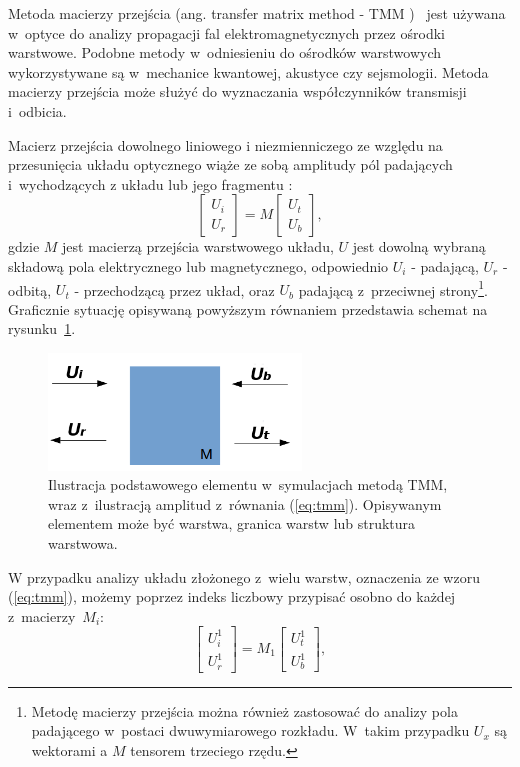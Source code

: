 \label{subart:tmm}
Metoda macierzy przejścia  (ang. transfer matrix method - TMM )~\cite{teich1991fundamentalsTMM} jest używana w~optyce do analizy propagacji fal elektromagnetycznych przez ośrodki warstwowe. Podobne metody w~odniesieniu do ośrodków warstwowych wykorzystywane są w~mechanice kwantowej, akustyce czy sejsmologii. Metoda macierzy przejścia może służyć do wyznaczania współczynników transmisji i~odbicia.

Macierz przejścia dowolnego liniowego i niezmienniczego ze względu na przesunięcia układu optycznego wiąże ze sobą amplitudy pól padających i~wychodzących z układu lub jego fragmentu \cite{markos2008wave,teich1991fundamentalsTMM}:
\begin{equation}
\begin{bmatrix}
U_i \\ 
U_r
\end{bmatrix}
= M 
\begin{bmatrix}
U_t \\
U_b
\end{bmatrix},
\label{eq:tmm}
\end{equation}
gdzie $M$ jest macierzą przejścia warstwowego układu, $U$ jest dowolną wybraną składową pola elektrycznego lub magnetycznego, odpowiednio $U_i$ - padającą, $U_r$ - odbitą, $U_t$ - przechodzącą przez układ, oraz $U_b$ padającą  z~przeciwnej strony\footnote{Metodę macierzy przejścia można również zastosować do analizy pola padającego w~postaci dwuwymiarowego rozkładu. W~takim przypadku $U_x$ są wektorami a $M$ tensorem trzeciego rzędu.}. Graficznie sytuację opisywaną powyższym równaniem przedstawia schemat na rysunku~\ref{fig:tmm-simple}.

\begin{figure}
	\includegraphics[width=0.6\textwidth]{images/tmm.png}
	\caption{Ilustracja podstawowego elementu w~symulacjach metodą TMM, wraz z~ilustracją amplitud z~równania (\ref{eq:tmm}). Opisywanym elementem może być warstwa, granica warstw lub struktura warstwowa. }
	\label{fig:tmm-simple}
\end{figure}

W przypadku analizy układu złożonego z~wielu warstw, oznaczenia ze wzoru (\ref{eq:tmm}), możemy poprzez indeks liczbowy przypisać osobno do każdej z~macierzy~$M_i$:
\begin{equation}
\begin{bmatrix}
U_i^1 \\ 
U_r^1
\end{bmatrix}
= M_1 
\begin{bmatrix}
U_t^1 \\
U_b^1
\end{bmatrix},
\label{eq:tmm-1l}
\end{equation}

